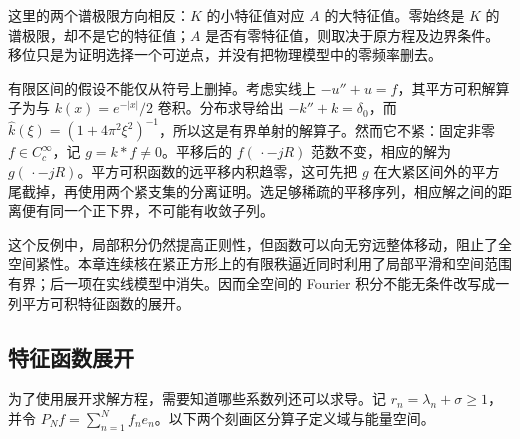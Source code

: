 \ProseParagraphBreak

这里的两个谱极限方向相反：\(K\) 的小特征值对应 \(A\) 的大特征值。零始终是 \(K\) 的谱极限，却不是它的特征值；\(A\) 是否有零特征值，则取决于原方程及边界条件。移位只是为证明选择一个可逆点，并没有把物理模型中的零频率删去。

\ProseParagraphBreak

有限区间的假设不能仅从符号上删掉。考虑实线上 \(-u''+u=f\)，其平方可积解算子为与 \(k(x)=e^{-|x|}/2\) 卷积。分布求导给出 \(-k''+k=\delta_0\)，而 \(\widehat k(\xi)=(1+4\pi^2\xi^2)^{-1}\)，所以这是有界单射的解算子。然而它不紧：固定非零 \(f\in C_c^\infty\)，记 \(g=k*f\ne0\)。平移后的 \(f(\,\cdot-jR)\) 范数不变，相应的解为 \(g(\,\cdot-jR)\)。平方可积函数的远平移内积趋零，这可先把 \(g\) 在大紧区间外的平方尾截掉，再使用两个紧支集的分离证明。选足够稀疏的平移序列，相应解之间的距离便有同一个正下界，不可能有收敛子列。

\ProseParagraphBreak

这个反例中，局部积分仍然提高正则性，但函数可以向无穷远整体移动，阻止了全空间紧性。本章连续核在紧正方形上的有限秩逼近同时利用了局部平滑和空间范围有界；后一项在实线模型中消失。因而全空间的 Fourier 积分不能无条件改写成一列平方可积特征函数的展开。

\subsection{特征函数展开}
\label{b2:subsec:100302}

为了使用展开求解方程，需要知道哪些系数列还可以求导。记 \(r_n=\lambda_n+\sigma\geq1\)，并令 \(P_Nf=\sum_{n=1}^Nf_ne_n\)。以下两个刻画区分算子定义域与能量空间。


